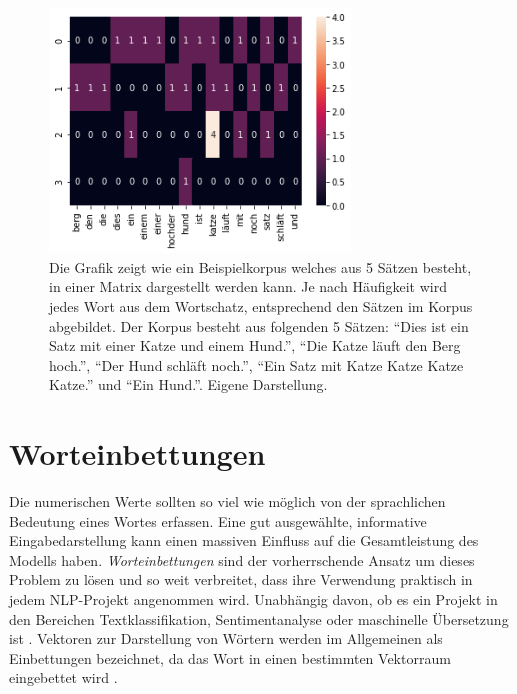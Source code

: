 \begin{figure}[H]
    \centering
    \includegraphics[width=8cm]{kapitel3/onhot.png}
    \caption[One-Hot-Encoding als Eingabematrix]{Die Grafik zeigt wie ein Beispielkorpus welches aus 5 Sätzen besteht, in einer Matrix dargestellt werden kann. Je nach Häufigkeit wird jedes Wort aus dem Wortschatz, entsprechend den Sätzen im Korpus abgebildet. Der Korpus besteht aus folgenden 5 Sätzen: \enquote{Dies ist ein Satz mit einer Katze und einem Hund.}, \enquote{Die Katze läuft den Berg hoch.}, \enquote{Der Hund schläft noch.}, \enquote{Ein Satz mit Katze Katze Katze Katze.} und \enquote{Ein Hund.}. Eigene Darstellung.}
    \label{OneHotGrafik}
\end{figure}





\section{Worteinbettungen}

Die numerischen Werte sollten so viel wie möglich von der sprachlichen Bedeutung eines Wortes erfassen. Eine gut ausgewählte, informative Eingabedarstellung kann einen massiven Einfluss auf die Gesamtleistung des Modells haben. \textit{Worteinbettungen} sind der vorherrschende Ansatz um dieses Problem zu lösen und so weit verbreitet, dass ihre Verwendung praktisch in jedem NLP-Projekt angenommen wird. Unabhängig davon, ob es ein Projekt in den Bereichen Textklassifikation, Sentimentanalyse oder maschinelle Übersetzung ist \cite*{Lecun2015}. Vektoren zur Darstellung von Wörtern werden im Allgemeinen als Einbettungen bezeichnet, da das Wort in einen bestimmten Vektorraum eingebettet wird \cite*[99]{Jurafskya}. 

